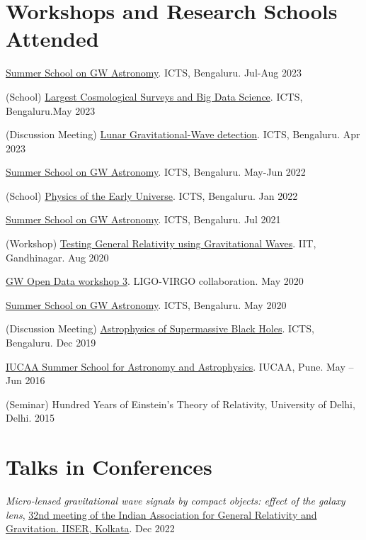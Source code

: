 \documentclass[margin,line]{res}
\begin{document}
\begin{resume}
\section{\sc Workshops and Research Schools Attended}
\begin{itemize}[noitemsep]
{
\item \href{https://www.icts.res.in/program/gws2023}{Summer School on GW Astronomy}. ICTS, Bengaluru. \hfill{Jul-Aug 2023}
\item (School) \href{https://icts.res.in/program/BigDataCosmo}{Largest Cosmological Surveys and Big Data Science}. ICTS, Bengaluru.\hfill{May 2023}
\item (Discussion Meeting) \href{https://www.icts.res.in/discussion-meeting/LGWD}{Lunar Gravitational-Wave detection}. ICTS, Bengaluru. \hfill{Apr 2023}
\item \href{https://www.icts.res.in/program/gws2022}{Summer School on GW Astronomy}. ICTS, Bengaluru. \hfill{May-Jun 2022}
\item (School) \href{https://www.icts.res.in/program/peu2022}{Physics of the Early Universe}. ICTS, Bengaluru. \hfill{Jan 2022} 
\item \href{https://www.icts.res.in/program/gws2021}{Summer School on GW Astronomy}. ICTS, Bengaluru. \hfill{Jul 2021}
\item (Workshop) \href{https://events.iitgn.ac.in/2020/TGRGW/}{Testing General Relativity using Gravitational Waves}. IIT, Gandhinagar. \hfill{Aug 2020}
\item \href{https://www.gw-openscience.org/static/workshop3/}{GW Open Data workshop 3}. LIGO-VIRGO collaboration. \hfill{May 2020}
\item \href{https://www.icts.res.in/program/gws2020}{Summer School on GW Astronomy}. ICTS, Bengaluru. \hfill{May 2020}
\item (Discussion Meeting) \href{https://www.icts.res.in/discussion-meeting/smbh2019}{Astrophysics of Supermassive Black Holes}. ICTS, Bengaluru. \hfill{Dec 2019}
\item \href{https://www-apps.iucaa.in/Stu-Prog-ISSIA.html}{IUCAA Summer School for Astronomy and Astrophysics}. IUCAA, Pune. \hfill{May -- Jun 2016}
\item (Seminar) Hundred Years of Einstein's Theory of Relativity, University of Delhi, Delhi. \hfill{2015}
}\end{itemize}


\section{\sc Talks in Conferences}
\begin{itemize}[noitemsep]
{
\item \textit{Micro-lensed gravitational wave signals by compact objects: effect of the galaxy lens}, \href{https://www.iiserkol.ac.in/~iagrg32/}{32nd meeting of the Indian Association for General Relativity and Gravitation. IISER, Kolkata}. \hfill{Dec 2022}
}\end{itemize}


\end{resume}
\end{document}
